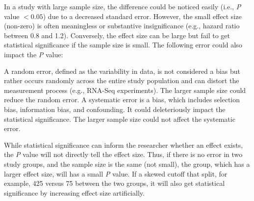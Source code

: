 \documentclass[preprint,12pt]{elsarticle}
\newenvironment{MyIndent}
{\par\leftskip1cm\relax\rightskip1cm\relax}
{\par\leftskip0cm\relax\rightskip0cm\relax}
\newenvironment{MyColorPar}[1]{%
    \leavevmode\color{#1}\ignorespaces%
}{%
}%
\begin{document}
\begin{MyColorPar}{blue}
\begin{MyIndent}
\begin{MyColorPar}{red}
In a study with large sample size, the difference could be noticed easily (i.e., \textit{P} value $< 0.05$) due to a decreased standard error\cite{Sullivan2012}.
However, the small effect size (non-zero) is often meaningless or substantive insignificance (e.g., hazard ratio between 0.8 and 1.2).
Conversely, the effect size can be large but fail to get statistical significance if the sample size is small. 
The following error could also impact the \textit{P} value:
\begin{outline}
\1 A random error, defined as the variability in data, is not considered a bias but rather occurs randomly across the entire study population and can distort the measurement process (e.g., RNA-Seq experiments).
The larger sample size could reduce the random error. 
\1 A systematic error is a bias, which includes selection bias, information bias, and confounding.
It could deleteriously impact the statistical significance.
The larger sample size could not affect the systematic error.
\end{outline}
While statistical significance can inform the researcher whether an effect exists, the \textit{P} value will not directly tell the effect size.
Thus, if there is no error in two study groups, and the sample size is the same (not small), the group, which has a larger effect size, will has a small \textit{P} value\cite{Thiese2016}.
If a skewed cutoff that split, for example, 425 versus 75 between the two groups, it will also get statistical significance by increasing effect size artificially.


\end{MyColorPar}
\end{MyIndent}
\end{MyColorPar}
\end{document}
